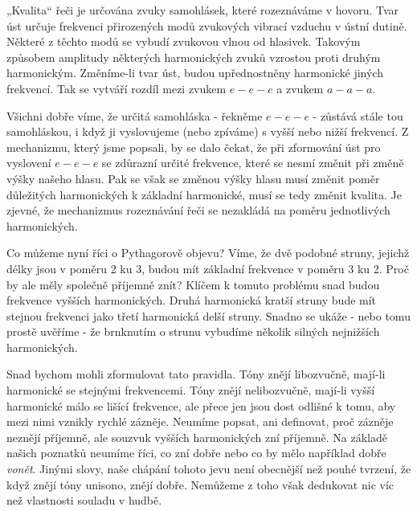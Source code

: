   „Kvalita“ řeči je určována zvuky samohlásek, které rozeznáváme v hovoru. Tvar úst určuje 
  frekvenci přirozených modů zvukových vibrací vzduchu v ústní dutině. Některé z těchto modů se 
  vybudí zvukovou vlnou od hlasivek. Takovým způsobem amplitudy některých harmonických zvuků 
  vzrostou proti druhým harmonickým. Změníme-li tvar úst, budou upřednostněny harmonické jiných 
  frekvencí. Tak se vytváří rozdíl mezi zvukem \(e - e - e\) a zvukem \(a - a - a\). 
  
  Všichni dobře víme, že určitá samohláska - řekněme \(e - e - e\) - zůstává stále tou samohláskou, 
  i když ji vyslovujeme (nebo zpíváme) s vyšší nebo nižší frekvencí. Z mechanizmu, který jsme 
  popsali, by se dalo čekat, že při zformování úst pro vyslovení \(e - e - e\) se zdůrazní určité 
  frekvence, které se nesmí změnit při změně výšky našeho hlasu. Pak se však se změnou výšky hlasu 
  musí změnit poměr důležitých harmonických k základní harmonické, musí se tedy změnit kvalita. Je 
  zjevné, že mechanizmus rozeznávání řeči se nezakládá na poměru jednotlivých harmonických. 
  
  Co můžeme nyní říci o Pythagorově objevu? Víme, že dvě podobné struny, jejichž délky jsou v 
  poměru \num{2} ku \num{3}, budou mít základní frekvence v poměru \num{3} ku \num{2}. Proč by ale 
  měly společně příjemně znít? Klíčem k tomuto problému snad budou frekvence vyšších harmonických. 
  Druhá harmonická kratší struny bude mít stejnou frekvenci jako třetí harmonická delší struny. 
  Snadno se ukáže - nebo tomu prostě uvěříme - že brnknutím o strunu vybudíme několik silných 
  nejnižších harmonických. 
  
  Snad bychom mohli zformulovat tato pravidla. Tóny znějí libozvučně, mají-li harmonické se 
  stejnými frekvencemi. Tóny znějí nelibozvučně, mají-li vyšší harmonické málo se lišící frekvence, 
  ale přece jen jsou dost odlišné k tomu, aby mezi nimi vznikly rychlé zázněje. Neumíme popsat, ani 
  definovat, proč zázněje neznějí příjemně, ale souzvuk vyšších harmonických zní příjemně. Na 
  základě našich poznatků neumíme říci, co zní dobře nebo co by mělo například dobře \emph{vonět}. 
  Jinými slovy, naše chápání tohoto jevu není obecnější než pouhé tvrzení, že když znějí tóny 
  unisono, znějí dobře. Nemůžeme z toho však dedukovat nic víc než vlastnosti souladu v hudbě. 
  

